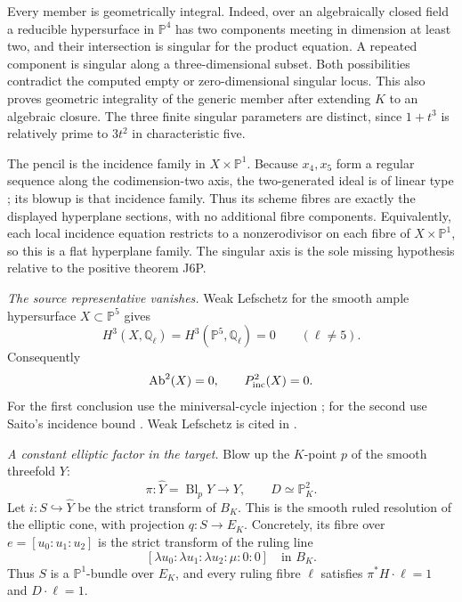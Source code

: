 Every member is geometrically integral. Indeed, over an
algebraically closed field a reducible hypersurface in
$\mathbb P^4$ has two components meeting in dimension at
least two, and their intersection is singular for the
product equation. A repeated component is singular along
a three-dimensional subset. Both possibilities contradict
the computed empty or zero-dimensional singular locus.
This also proves geometric integrality of the generic
member after extending $K$ to an algebraic closure. The
three finite singular parameters are distinct, since
$1+t^3$ is relatively prime to $3t^2$ in characteristic five.

The pencil is the incidence family in $X\times\mathbb P^1$.
Because $x_4,x_5$ form a regular sequence along the
codimension-two axis, the two-generated ideal is of linear
type \cite[Proposition IV-25, pp.~172--173]{DGJ_EisenbudHarris2000};
its blowup is that incidence family. Thus its scheme
fibres are exactly the displayed hyperplane sections,
with no additional fibre components. Equivalently, each
local incidence equation restricts to a nonzerodivisor on
each fibre of $X\times\mathbb P^1$, so this is a flat
hyperplane family. The singular axis is the sole missing
hypothesis relative to the positive theorem J6P.

\emph{The source representative vanishes.}
Weak Lefschetz for the smooth ample hypersurface
$X\subset\mathbb P^5$ gives
\[
 H^3(X,\mathbb Q_\ell)=H^3(\mathbb P^5,\mathbb Q_\ell)=0
 \qquad(\ell\ne5).
\]
Consequently
\begin{equation}\label{eq:J6C-zero-source}
 \operatorname{Ab}^2(X)=0,\qquad P^2_{\rm inc}(X)=0.
\end{equation}
For the first conclusion use the miniversal-cycle injection
\cite[Proposition 8.2, p.~31]{DGJ_ACMVFunctor}; for the
second use Saito's incidence bound
\cite[Proposition 3.4, pp.~109--110]{DGJ_Saito1979}.
Weak Lefschetz is cited in
\cite[(4.1.6), pp.~218--219]{DGJ_Deligne1980}.

\emph{A constant elliptic factor in the target.}
Blow up the $K$-point $p$ of the smooth threefold $Y$:
\[
 \pi:\widehat Y=\operatorname{Bl}_pY\longrightarrow Y,
 \qquad D\simeq\mathbb P^2_K.
\]
Let $i:S\hookrightarrow\widehat Y$ be the strict transform
of $B_K$. This is the smooth ruled resolution of the
elliptic cone, with projection $q:S\to E_K$. Concretely,
its fibre over $e=[u_0:u_1:u_2]$ is the strict transform
of the ruling line
\[
 [\lambda u_0:\lambda u_1:\lambda u_2:\mu:0:0]
 \quad\text{in }B_K.
\]
Thus $S$ is a $\mathbb P^1$-bundle over $E_K$, and every
ruling fibre $\ell$ satisfies
$\pi^*H\cdot\ell=1$ and $D\cdot\ell=1$.

